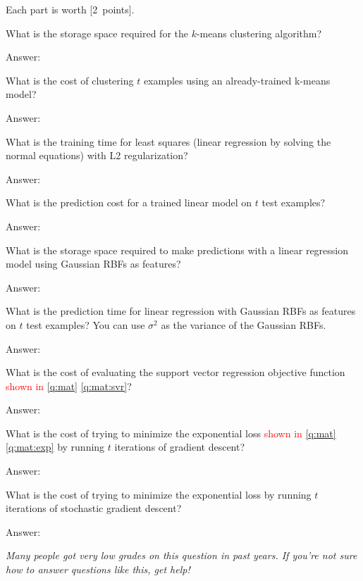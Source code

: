 \documentclass{article}
\newenvironment{answer}{\par\begingroup\color{answer}Answer: }{\endgroup}
\newcommand{\red}[1]{\textcolor{red}{#1}}
\newcommand{\pts}[1]{\textcolor{points}{[#1~points]}}
\newcommand{\meta}[1]{\textcolor{black!60!white}{\emph{#1}}}
\newcommand{\TODO}{\color{red}{TODO}}
\begin{document}
Each part is worth \pts{2}.

\begin{qlist}\color{question}
\item What is the storage space required for the $k$-means clustering algorithm?
\begin{answer}\TODO\end{answer}

\item What is the cost of clustering $t$ examples using an already-trained k-means model?
\begin{answer}\TODO\end{answer}


\item What is the training time for least squares (linear regression by solving the normal equations) with L2 regularization?
\begin{answer}\TODO\end{answer}

\item What is the prediction cost for a trained linear model on $t$ test examples?
\begin{answer}\TODO\end{answer}

\item What is the storage space required to make predictions with a linear regression model using Gaussian RBFs as features?
\begin{answer}\TODO\end{answer}

\item What is the prediction time for linear regression with Gaussian RBFs as features on $t$ test examples? You can use $\sigma^2$ as the variance of the Gaussian RBFs.
\begin{answer}\TODO\end{answer}

\item What is the cost of evaluating the support vector regression objective function \red{shown in \cref{q:mat} \cref{q:mat:svr}}?
\begin{answer}\TODO\end{answer}

\item What is the cost of trying to minimize the exponential loss \red{shown in \cref{q:mat} \cref{q:mat:exp}} by running $t$ iterations of gradient descent?
\begin{answer}\TODO\end{answer}

\item What is the cost of trying to minimize the exponential loss  by running $t$ iterations of stochastic gradient descent?
\begin{answer}\TODO\end{answer}
\end{qlist}
\meta{Many people got very low grades on this question in past years. If you're not sure how to answer questions like this, get help!}
\end{document}
